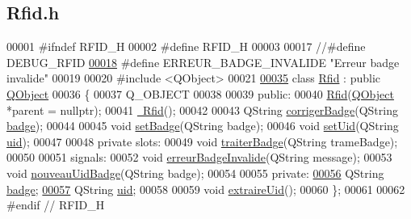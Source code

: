 \hypertarget{_rfid_8h_source}{}\subsection{Rfid.\+h}
\label{_rfid_8h_source}

\begin{DoxyCode}
00001 \textcolor{preprocessor}{#ifndef RFID\_H}
00002 \textcolor{preprocessor}{#define RFID\_H}
00003 
00017 \textcolor{comment}{//#define DEBUG\_RFID}
\hyperlink{_rfid_8h_aad43c23a448ffc828e0b6014cfaf980a}{00018} \textcolor{preprocessor}{#define ERREUR\_BADGE\_INVALIDE "Erreur badge invalide" }
00019 \textcolor{preprocessor}{}
00020 \textcolor{preprocessor}{#include <QObject>}
00021 
\hyperlink{class_rfid}{00035} \textcolor{keyword}{class }\hyperlink{class_rfid}{Rfid} : \textcolor{keyword}{public} \hyperlink{class_q_object}{QObject}
00036 \{
00037     Q\_OBJECT
00038 
00039 \textcolor{keyword}{public}:
00040     \hyperlink{class_rfid_aa00c7163ce0e3fda6596353d40a458a9}{Rfid}(\hyperlink{class_q_object}{QObject} *parent = \textcolor{keyword}{nullptr});
00041     \hyperlink{class_rfid_a563836053a71a9fdc566a812da0cf5c1}{~Rfid}();
00042 
00043     QString \hyperlink{class_rfid_afb99366646ac75b7e1d28302d38bf4f2}{corrigerBadge}(QString \hyperlink{class_rfid_ac634cd26ffbe1c6da3967dc4af53b734}{badge});
00044 
00045     \textcolor{keywordtype}{void} \hyperlink{class_rfid_a51021c0899dab1d5fb08e3dd6d93e425}{setBadge}(QString badge);
00046     \textcolor{keywordtype}{void} \hyperlink{class_rfid_ac79b994b32bf7a7cbad9d9988e721564}{setUid}(QString \hyperlink{class_rfid_a157b71d282a7e067c65b431dbae6c6c8}{uid});
00047 
00048 \textcolor{keyword}{private} slots:
00049     \textcolor{keywordtype}{void} \hyperlink{class_rfid_a5b4f31b235afebee620e42c52ab60213}{traiterBadge}(QString trameBadge);
00050 
00051 signals:
00052     \textcolor{keywordtype}{void} \hyperlink{class_rfid_a896a20a2fbe2ac7d842456a1161717cb}{erreurBadgeInvalide}(QString message);
00053     \textcolor{keywordtype}{void} \hyperlink{class_rfid_a76990ba3147098e80ac6fc67af6439d1}{nouveauUidBadge}(QString badge);
00054 
00055 \textcolor{keyword}{private}:
\hyperlink{class_rfid_ac634cd26ffbe1c6da3967dc4af53b734}{00056}     QString \hyperlink{class_rfid_ac634cd26ffbe1c6da3967dc4af53b734}{badge}; 
\hyperlink{class_rfid_a157b71d282a7e067c65b431dbae6c6c8}{00057}     QString \hyperlink{class_rfid_a157b71d282a7e067c65b431dbae6c6c8}{uid}; 
00058 
00059     \textcolor{keywordtype}{void} \hyperlink{class_rfid_a884e849f175045d78587e1e09a87cb00}{extraireUid}();
00060 \};
00061 
00062 \textcolor{preprocessor}{#endif // RFID\_H}
\end{DoxyCode}

